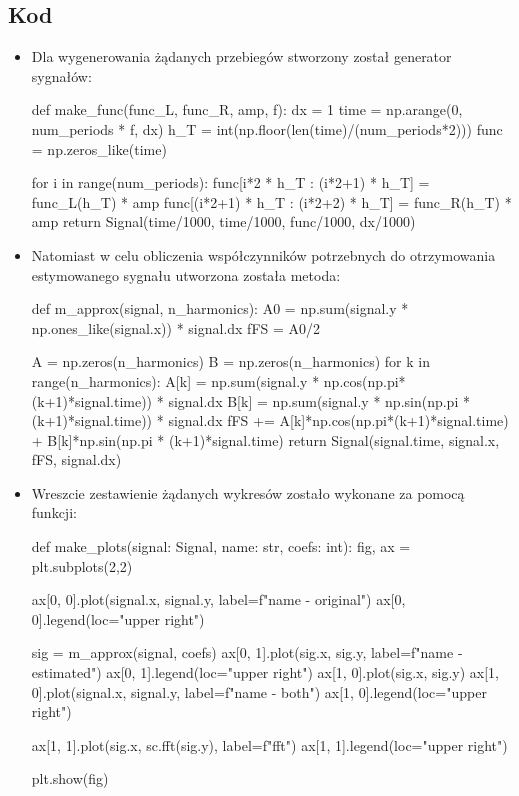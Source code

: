 \documentclass[13pt]{article}
\begin{document}
\subsection{Kod}
\begin{itemize}
\item Dla wygenerowania żądanych przebiegów stworzony został generator sygnałów:
\begin{pyverbatim}
def make_func(func_L, func_R, amp, f):
    dx = 1
    time = np.arange(0, num_periods * f, dx)
    h_T = int(np.floor(len(time)/(num_periods*2)))
    func = np.zeros_like(time)

    for i in range(num_periods):
        func[i*2 * h_T : (i*2+1) * h_T] = func_L(h_T) * amp
        func[(i*2+1) * h_T : (i*2+2) * h_T] = func_R(h_T) * amp
    return Signal(time/1000, time/1000, func/1000, dx/1000)
\end{pyverbatim}

\item Natomiast w celu obliczenia współczynników potrzebnych do otrzymowania estymowanego sygnału utworzona została metoda:
\begin{pyverbatim}
def m_approx(signal, n_harmonics):
    A0 = np.sum(signal.y * np.ones_like(signal.x)) * signal.dx
    fFS = A0/2

    A = np.zeros(n_harmonics)
    B = np.zeros(n_harmonics)
    for k in range(n_harmonics):
        A[k] = np.sum(signal.y * np.cos(np.pi*(k+1)*signal.time)) * signal.dx
        B[k] = np.sum(signal.y * np.sin(np.pi * (k+1)*signal.time)) * signal.dx
        fFS += A[k]*np.cos(np.pi*(k+1)*signal.time) + B[k]*np.sin(np.pi * (k+1)*signal.time)
    return Signal(signal.time, signal.x, fFS, signal.dx)
\end{pyverbatim}

\item Wreszcie zestawienie żądanych wykresów zostało wykonane za pomocą funkcji:
\begin{pyverbatim}
def make_plots(signal: Signal, name: str, coefs: int):
    fig, ax = plt.subplots(2,2)

    ax[0, 0].plot(signal.x, signal.y, label=f"{name} - original")
    ax[0, 0].legend(loc="upper right")

    sig = m_approx(signal, coefs)
    ax[0, 1].plot(sig.x, sig.y, label=f"{name} - estimated")
    ax[0, 1].legend(loc="upper right")
    ax[1, 0].plot(sig.x, sig.y)
    ax[1, 0].plot(signal.x, signal.y, label=f"{name} - both")
    ax[1, 0].legend(loc="upper right")

    ax[1, 1].plot(sig.x, sc.fft(sig.y), label=f"fft")
    ax[1, 1].legend(loc="upper right")

    plt.show(fig)
\end{pyverbatim}
\end{itemize}
\newpage
\end{document}
